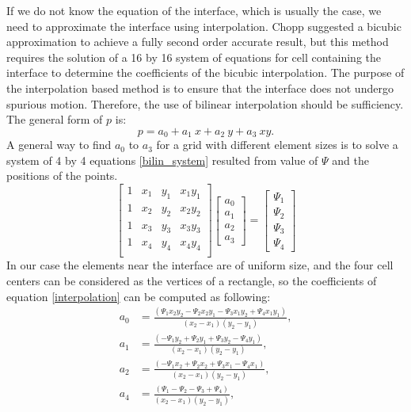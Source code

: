 \documentclass[letterpaper,10pt]{article}
\begin{document}
If we do not know the equation of the interface, which is usually the case, 
we need to approximate the interface using interpolation. Chopp suggested a bicubic approximation \cite{Chopp2001} to achieve a fully second order accurate 
result, but this method requires the solution of a 16 by 16 system of equations for cell containing the interface to determine the coefficients 
of the bicubic interpolation. 
The purpose of the interpolation based method is to ensure that the interface does not undergo spurious motion.
Therefore, the use of bilinear interpolation should be sufficiency. The general form of $p$ is:
\begin{equation}\label{interpolation}
p=a_0+a_1 \ x+ a_2 \ y+ a_3 \ xy.
\end{equation} 
A general way to find $a_0$ to $a_3$ for a grid with different element sizes is to solve a system of 4 by 4 equations \eqref{bilin_system} resulted from value of $\varPsi$ and the 
positions of the points. 
\begin{equation}
\label{bilin_system}
\begin{bmatrix}
    1 & x_1 & y_1 & x_1 y_1 \\
    1 & x_2 & y_2 & x_2 y_2 \\
    1 & x_3 & y_3 & x_3 y_3 \\
    1 & x_4 & y_4 & x_4 y_4 \\
\end{bmatrix}
\begin{bmatrix}
    a_0 \\
    a_1 \\
    a_2 \\
    a_3
\end{bmatrix}
=
\begin{bmatrix}
    \varPsi_1  \\
   \varPsi_2  \\
    \varPsi_3  \\
     \varPsi_4  
\end{bmatrix}
\end{equation} 
In our case the elements near the interface are of uniform size, and the four cell centers can be considered as the vertices of a rectangle, so the coefficients of 
equation \eqref{interpolation} can be computed as following:
\begin{subequations}
\begin{align}
a_0&=\frac{(\varPsi_1 x_2 y_2 - \varPsi_2 x_2 y_1 - \varPsi_3 x_1 y_2 + \varPsi_4 x_1 y_1)}{(x_2-x_1)(y_2-y_1)}, \\ 
a_1&=\frac{(-\varPsi_1 y_2 + \varPsi_2 y_1 + \varPsi_3 y_2 - \varPsi_4 y_1)}{(x_2-x_1)(y_2-y_1)},\\
a_2&=\frac{(-\varPsi_1 x_2 + \varPsi_2 x_2 + \varPsi_3 x_1 - \varPsi_4 x_1 )}{(x_2-x_1)(y_2-y_1)}, \\ 
a_4&=\frac{(\varPsi_1 - \varPsi_2 - \varPsi_3 + \varPsi_4)}{(x_2-x_1)(y_2-y_1)}, \\ 
\end{align}
\end{subequations}
\end{document}
